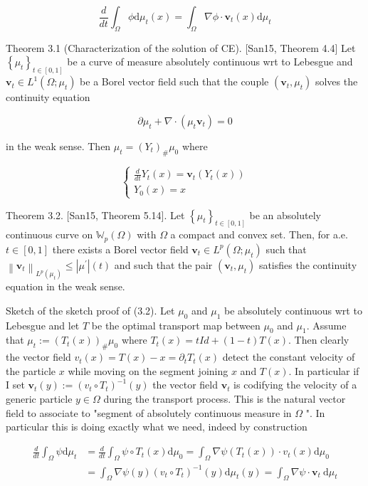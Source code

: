 \documentclass[10pt]{article}
\begin{document}
\[
\frac{d}{d t} \int_{\Omega} \phi \mathrm{d} \mu_{t}(x)=\int_{\Omega} \nabla \phi \cdot \mathbf{v}_{t}(x) \mathrm{d} \mu_{t}
\]

Theorem 3.1 (Characterization of the solution of CE). [San15, Theorem 4.4] Let \(\left\{\mu_{t}\right\}_{t \in[0,1]}\) be a curve of measure absolutely continuous wrt to Lebesgue and \(\mathbf{v}_{t} \in L^{1}\left(\Omega ; \mu_{t}\right)\) be a Borel vector field such that the couple \(\left(\mathbf{v}_{t}, \mu_{t}\right)\) solves the continuity equation

\[
\partial \mu_{t}+\nabla \cdot\left(\mu_{t} \mathbf{v}_{t}\right)=0
\]

in the weak sense. Then \(\mu_{t}=\left(Y_{t}\right)_{\#} \mu_{0}\) where

\[
\left\{\begin{array}{l}
\frac{d}{d t} Y_{t}(x)=\mathbf{v}_{t}\left(Y_{t}(x)\right) \\
Y_{0}(x)=x
\end{array}\right.
\]

Theorem 3.2. [San15, Theorem 5.14]. Let \(\left\{\mu_{t}\right\}_{t \in[0,1]}\) be an absolutely continuous curve on \(\mathbb{W}_{p}(\Omega)\) with \(\Omega\) a compact and convex set. Then, for a.e. \(t \in[0,1]\) there exists a Borel vector field \(\mathbf{v}_{t} \in L^{p}\left(\Omega ; \mu_{t}\right)\) such that \(\left\|\mathbf{v}_{t}\right\|_{L^{p}\left(\mu_{t}\right)} \leq\left|\mu^{\prime}\right|(t)\) and such that the pair \(\left(\mathbf{v}_{t}, \mu_{t}\right)\) satisfies the continuity equation in the weak sense.

Sketch of the sketch proof of (3.2). Let \(\mu_{0}\) and \(\mu_{1}\) be absolutely continuous wrt to Lebesgue and let \(T\) be the optimal transport map between \(\mu_{0}\) and \(\mu_{1}\). Assume that \(\mu_{t}:=\left(T_{t}(x)\right)_{\#} \mu_{0}\) where \(T_{t}(x)=t I d+(1-t) T(x)\). Then clearly the vector field \(v_{t}(x)=T(x)-x=\partial_{t} T_{t}(x)\) detect the constant velocity of the particle \(x\) while moving on the segment joining \(x\) and \(T(x)\). In particular if I set \(\mathbf{v}_{t}(y):=\left(v_{t} \circ T_{t}\right)^{-1}(y)\) the vector field \(\mathbf{v}_{t}\) is codifying the velocity of a generic particle \(y \in \Omega\) during the transport process. This is the natural vector field to associate to "segment of absolutely continuous measure in \(\Omega\) ". In particular this is doing exactly what we need, indeed by construction

\[
\begin{aligned}
\frac{d}{d t} \int_{\Omega} \psi \mathrm{d} \mu_{t} & =\frac{d}{d t} \int_{\Omega} \psi \circ T_{t}(x) \mathrm{d} \mu_{0}=\int_{\Omega} \nabla \psi\left(T_{t}(x)\right) \cdot v_{t}(x) \mathrm{d} \mu_{0} \\
& =\int_{\Omega} \nabla \psi(y)\left(v_{t} \circ T_{t}\right)^{-1}(y) \mathrm{d} \mu_{t}(y)=\int_{\Omega} \nabla \psi \cdot \mathbf{v}_{t} \mathrm{~d} \mu_{t}
\end{aligned}
\]
\end{document}
